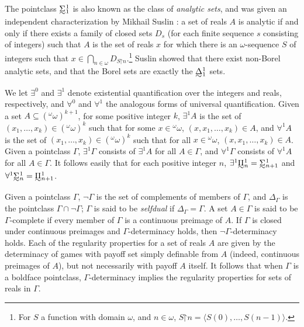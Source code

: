 \documentclass{book}%
\newcommand{\breals}{{^{\omega}}\omega}
\def\underTilde#1{{\baselineskip=0pt\vtop{\hbox{$#1$}\hbox{$\sim$}}}{}}
\newcommand{\uTPi}{\underTilde{\Pi}}
\newcommand{\uTSigma}{\underTilde{\Sigma}}
\newcommand{\uTDelta}{\underTilde{\Delta}}
\newcommand{\restrict}{\mathord{\upharpoonright}}
\begin{document}
The pointclass $\uTSigma^{1}_{1}$ is also known as the class of
\emph{analytic sets}, and was given an
independent characterization by Mikhail Suslin : a set of reals $A$ is
analytic if and only if there exists a family of closed sets $D_{s}$ (for each finite sequence $s$ consisting of integers)
such that $A$ is the set of reals $x$ for which there is an $\omega$-sequence $S$ of integers such that $x \in \bigcap_{n \in \omega}D_{S \restrict n}$.\footnote{For $S$ a function with domain $\omega$, and $n \in \omega$, $S \restrict n = \langle S(0),\ldots, S(n-1)\rangle$.}
Suslin showed that
there exist non-Borel analytic sets, and that
the Borel sets are exactly the $\uTDelta^{1}_{1}$ sets.


We let $\exists^{0}$ and $\exists^{1}$
denote existential quantification over the integers and reals,
respectively, and $\forall^{0}$ and $\forall^{1}$ the analogous
forms of universal quantification. Given a set $A \subseteq(\breals)^{k+1}$, for some positive integer $k$, $\exists^{1}A$ is
the set of $(x_{1},\ldots,x_{k}) \in (\breals)^{k}$
such that for some $x \in \breals$, $(x, x_{1},\ldots,x_{k}
) \in A$, and $\forall^{1}A$ is the set of $(x_{1},\ldots,x_{k}) \in (\breals)^{k}$ such that for all $x
\in \breals$, $(x, x_{1},\ldots,x_{k}) \in A$. Given a
pointclass $\Gamma$, $\exists^{1}\Gamma$ consists of $\exists^{1}A$
for all $A \in \Gamma$, and $\forall^{1}\Gamma$ consists of
$\forall^{1}A$ for all $A \in \Gamma$. It follows easily that for each
positive integer $n$, $\exists^{1}\uTPi^{1}_{n} = \uTSigma^{1}_{n+1}$ and
$\forall^{1}\uTSigma^{1}_{n} = \uTPi^{1}_{n+1}$.

Given a pointclass $\Gamma$, $\neg \Gamma$\index{$\neg\Gamma$} is the set of complements of members of $\Gamma$,
and $\Delta_{\Gamma}$ is the pointclass $\Gamma \cap \neg\Gamma$;\index{$\Delta_{\Gamma}$}
$\Gamma$ is said to be
\emph{selfdual}
if $\Delta_{\Gamma} = \Gamma$.
A set $A \in \Gamma$ is said to be $\Gamma$-complete if
every member of $\Gamma$ is a continuous preimage of $A$.
If $\Gamma$ is closed under continuous preimages
and $\Gamma$-determinacy holds, then $\neg\Gamma$-determinacy holds.
Each of the regularity properties for a set of reals $A$ are given
by the determinacy of games with payoff set simply definable from
$A$ (indeed, continuous preimages of $A$), but not necessarily with payoff $A$
itself. It follows that when $\Gamma$ is a boldface pointclass,
$\Gamma$-determinacy implies the regularity properties for sets of
reals in $\Gamma$.
\end{document}
